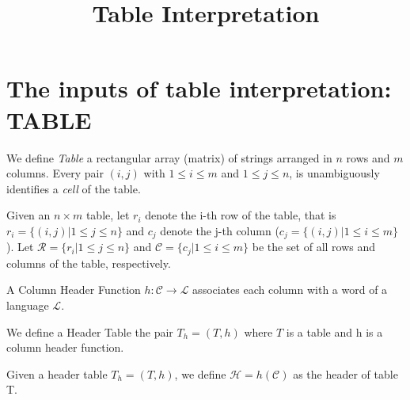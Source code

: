 \documentclass{llncs}
\begin{document}
\title{Table Interpretation}

\author{}

\maketitle

\begin{abstract}
\end{abstract}

\section{The inputs of table interpretation: TABLE}
\begin{definition}[Table]
      We define \textit{Table} a rectangular array (matrix) of strings arranged in $n$ rows and $m$ columns. Every pair $(i,j)$ with $1\leq i \leq m$ and $1\leq j \leq n$, is unambiguously identifies a \textit{cell} of the table.
\end{definition}

\begin{definition}
      Given an $n\times m$ table, let $r_i$ denote the i-th row of the table, that is $r_i =\{(i,j) | 1\leq j \leq n\}$ and  $c_j$ denote the j-th column ($c_j =\{(i,j) |1\leq i \leq m\}$).
      Let $\mathcal{R} = \{r_i | 1\leq j \leq n\}$ and $\mathcal{C} = \{c_j|1\leq i \leq m\}$ be the set of all rows and columns of the table, respectively.
\end{definition}

\begin{definition}
      A Column Header Function $h: \mathcal{C}\to \mathcal{L}$ associates each column with a word of a language $\mathcal{L}$.
\end{definition}

\begin{definition}
      We define a Header Table the pair $T_h =(T, h)$ where  $T$ is a table and h is a column header function.
\end{definition}

\begin{definition}[Header]
      Given a header table $T_h =(T, h)$, we define $\mathcal{H}=h(\mathcal{C})$ as the header of table T.
\end{definition}
\end{document}
